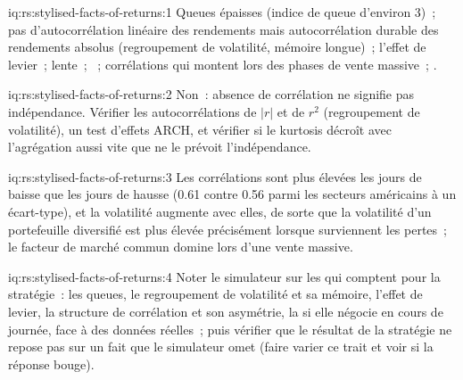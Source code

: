 \begin{solution}{iq:rs:stylised-facts-of-returns:1}
Queues épaisses (indice de queue d'environ 3)~; pas d'autocorrélation linéaire des rendements mais autocorrélation durable des rendements absolus
(regroupement de volatilité, mémoire longue)~; l'effet de levier~;  lente~; ~; corrélations
qui montent lors des phases de vente massive~; .
\end{solution}

\begin{solution}{iq:rs:stylised-facts-of-returns:2}
Non~: absence de corrélation ne signifie pas indépendance. Vérifier les autocorrélations de $|r|$ et de $r^2$ (regroupement de volatilité), un test d'effets ARCH,
et vérifier si le kurtosis décroît avec l'agrégation aussi vite que ne le prévoit l'indépendance.
\end{solution}

\begin{solution}{iq:rs:stylised-facts-of-returns:3}
Les corrélations sont plus élevées les jours de baisse que les jours de hausse (0.61 contre 0.56 parmi les secteurs américains à un écart-type), et
la volatilité augmente avec elles, de sorte que la volatilité d'un portefeuille diversifié est plus élevée précisément lorsque surviennent les pertes~; le facteur de marché commun
domine lors d'une vente massive.
\end{solution}

\begin{solution}{iq:rs:stylised-facts-of-returns:4}
Noter le simulateur sur les  qui comptent pour la stratégie~: les queues, le regroupement de volatilité et sa mémoire, l'effet de levier, la structure de corrélation et son
asymétrie, la  si elle négocie en cours de journée, face à des données réelles~; puis vérifier que le résultat de la stratégie ne repose pas sur
un fait que le simulateur omet (faire varier ce trait et voir si la réponse bouge).
\end{solution}

